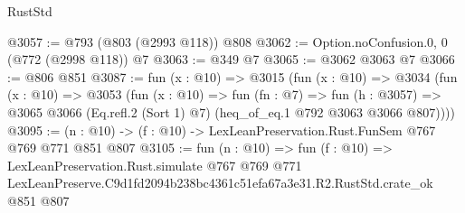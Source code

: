 \begin{lexlean}{RustStd}
\begin{coremodule}
@3057 := @793 (@803 (@2993 @118)) @808
@3062 := Option.noConfusion.{0, 0} (@772 (@2998 @118)) @7
@3063 := @349 @7
@3065 := @3062 @3063 @7
@3066 := @806 @851
@3087 := fun (x : @10) =>
  @3015
    (fun (x : @10) =>
    @3034
      (fun (x : @10) =>
      @3053
        (fun (x : @10) =>
        fun (fn : @7) =>
        fun (h : @3057) =>
        @3065 @3066 (Eq.refl.{2} (Sort 1) @7) (heq_of_eq.{1} @792 @3063 @3066 @807))))
@3095 := (n : @10) -> (f : @10) -> LexLeanPreservation.Rust.FunSem @767 @769 @771 @851 @807
@3105 := fun (n : @10) =>
  fun (f : @10) =>
  LexLeanPreservation.Rust.simulate
    @767
    @769
    @771
    LexLeanPreserve.C9d1fd2094b238bc4361c51efa67a3e31.R2.RustStd.crate_ok
    @851
    @807
\end{coremodule}
\end{lexlean}
